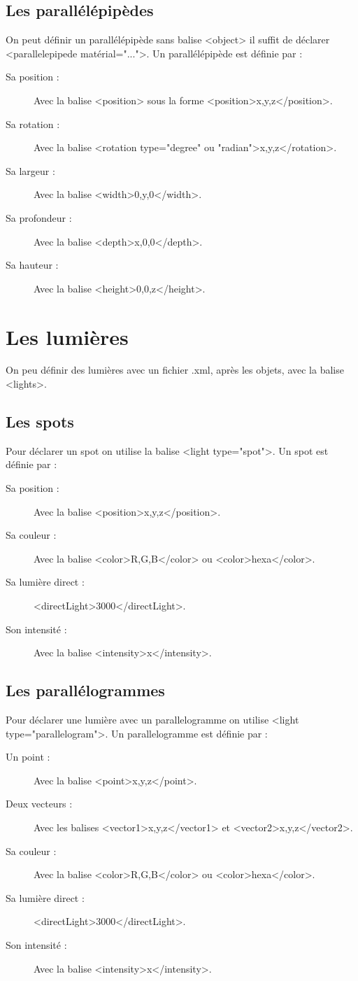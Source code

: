 \documentclass{report}
\begin{document}
\section{Les parall\'el\'epip\`edes}
On peut d\'efinir un parall\'el\'epip\`ede sans balise <object> il suffit de d\'eclarer <parallelepipede mat\'erial="...">.
\newline Un parall\'el\'epip\`ede est d\'efinie par :
\begin{description}
 \item [Sa position :] Avec la balise <position> sous la forme <position>x,y,z</position>.
 \item [Sa rotation :] Avec la balise <rotation type="degree" ou "radian">x,y,z</rotation>.
 \item [Sa largeur :] Avec la balise <width>0,y,0</width>.
 \item [Sa profondeur :] Avec la balise <depth>x,0,0</depth>.
 \item [Sa hauteur :] Avec la balise <height>0,0,z</height>.
\end{description}
\chapter{Les lumi\`eres}
On peu d\'efinir des lumi\`eres avec un fichier .xml, apr\`es les objets, avec la balise <lights>.
\section{Les spots}
Pour d\'eclarer un spot on utilise la balise <light type="spot">.
\newline Un spot est d\'efinie par :
\begin{description}
 \item [Sa position :] Avec la balise <position>x,y,z</position>.
 \item [Sa couleur :] Avec la balise <color>R,G,B</color> ou <color>hexa</color>.
 \item [Sa lumi\`ere direct :] <directLight>3000</directLight>.
 \item [Son intensit\'e :] Avec la balise <intensity>x</intensity>.
\end{description}
\section{Les parall\'elogrammes}
Pour d\'eclarer une lumi\`ere avec un parallelogramme on utilise <light type="parallelogram">.
Un parallelogramme est d\'efinie par :
\begin{description}
 \item [Un point :] Avec la balise <point>x,y,z</point>.
 \item [Deux vecteurs :] Avec les balises <vector1>x,y,z</vector1> et <vector2>x,y,z</vector2>.
 \item [Sa couleur :] Avec la balise <color>R,G,B</color> ou <color>hexa</color>.
 \item [Sa lumi\`ere direct :] <directLight>3000</directLight>.
 \item [Son intensit\'e :] Avec la balise <intensity>x</intensity>.
\end{description}
\end{document}
